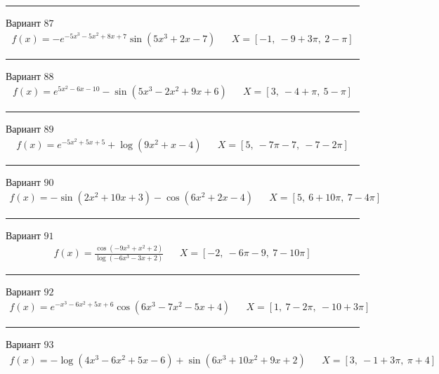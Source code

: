 \documentclass[11pt]{report}
\begin{document}
\begin{center}
    \noindent\rule{8cm}{0.4pt}
\end{center}
Вариант \(87\)
\begin{align*}
    f(x) = - e^{- 5 x^{3} - 5 x^{2} + 8 x + 7} \sin{\left(5 x^{3} + 2 x - 7 \right)} && X = \left[ -1, \  -9 + 3 \pi, \  2 - \pi\right]
\end{align*}
\begin{center}
    \noindent\rule{8cm}{0.4pt}
\end{center}
Вариант \(88\)
\begin{align*}
    f(x) = e^{5 x^{2} - 6 x - 10} - \sin{\left(5 x^{3} - 2 x^{2} + 9 x + 6 \right)} && X = \left[ 3, \  -4 + \pi, \  5 - \pi\right]
\end{align*}
\begin{center}
    \noindent\rule{8cm}{0.4pt}
\end{center}
Вариант \(89\)
\begin{align*}
    f(x) = e^{- 5 x^{2} + 5 x + 5} + \log{\left(9 x^{2} + x - 4 \right)} && X = \left[ 5, \  - 7 \pi - 7, \  -7 - 2 \pi\right]
\end{align*}
\begin{center}
    \noindent\rule{8cm}{0.4pt}
\end{center}
Вариант \(90\)
\begin{align*}
    f(x) = - \sin{\left(2 x^{2} + 10 x + 3 \right)} - \cos{\left(6 x^{2} + 2 x - 4 \right)} && X = \left[ 5, \  6 + 10 \pi, \  7 - 4 \pi\right]
\end{align*}
\begin{center}
    \noindent\rule{8cm}{0.4pt}
\end{center}
Вариант \(91\)
\begin{align*}
    f(x) = \frac{\cos{\left(- 9 x^{3} + x^{2} + 2 \right)}}{\log{\left(- 6 x^{3} - 3 x + 2 \right)}} && X = \left[ -2, \  - 6 \pi - 9, \  7 - 10 \pi\right]
\end{align*}
\begin{center}
    \noindent\rule{8cm}{0.4pt}
\end{center}
Вариант \(92\)
\begin{align*}
    f(x) = e^{- x^{3} - 6 x^{2} + 5 x + 6} \cos{\left(6 x^{3} - 7 x^{2} - 5 x + 4 \right)} && X = \left[ 1, \  7 - 2 \pi, \  -10 + 3 \pi\right]
\end{align*}
\begin{center}
    \noindent\rule{8cm}{0.4pt}
\end{center}
Вариант \(93\)
\begin{align*}
    f(x) = - \log{\left(4 x^{3} - 6 x^{2} + 5 x - 6 \right)} + \sin{\left(6 x^{3} + 10 x^{2} + 9 x + 2 \right)} && X = \left[ 3, \  -1 + 3 \pi, \  \pi + 4\right]
\end{align*}
\end{document}
